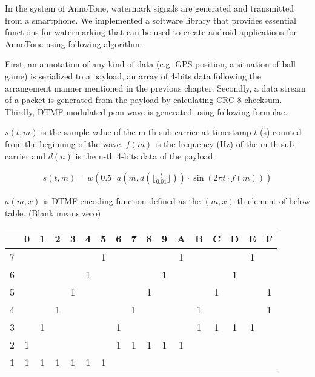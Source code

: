 In the system of AnnoTone, watermark signals are generated and transmitted from a smartphone.
We implemented a software library that provides essential functions for watermarking that can be used to create android applications for AnnoTone using following algorithm.

First, an annotation of any kind of data (e.g. GPS position, a situation of ball game) is serialized to a payload, an array of 4-bits data following the arrangement manner mentioned in the previous chapter.
Secondly, a data stream of a packet is generated from the payload by calculating CRC-8 checksum.
Thirdly, DTMF-modulated pcm wave is generated using following formulae.

$s(t, m)$ is the sample value of the m-th sub-carrier at timestamp $t$ (s) counted from the beginning of the wave. $f(m)$ is the frequency (Hz) of the m-th sub-carrier and $d(n)$ is the n-th 4-bits data of the payload.

\begin{align}
s(t, m) = w( 0.5 \cdot a(m, d(\lfloor \frac{t}{0.01} \rfloor)) \cdot \sin{(2 \pi t \cdot f(m))} )
\end{align}

$a(m, x)$ is DTMF encoding function defined as the $(m, x)$-th element of below table.
(Blank means zero)

\begin{table}[ht]
\begin{center}
	\begin{tabular}{|c||c|c|c|c|c|c|c|c|c|c|c|c|c|c|c|c|} \hline
		  & 0 & 1 & 2 & 3 & 4 & 5 & 6 & 7 & 8 & 9 & A & B & C & D & E & F \\ \hline \hline
		7 &   &   &   &   &   & 1 &   &   &   &   & 1 &   &   &   & 1 &   \\ \hline
		6 &   &   &   &   & 1 &   &   &   &   & 1 &   &   &   & 1 &   &   \\ \hline
		5 &   &   &   & 1 &   &   &   &   & 1 &   &   &   & 1 &   &   & 1 \\ \hline
		4 &   &   & 1 &   &   &   &   & 1 &   &   &   & 1 &   &   &   & 1 \\ \hline
		3 &   & 1 &   &   &   &   & 1 &   &   &   &   & 1 & 1 & 1 & 1 &   \\ \hline
		2 & 1 &   &   &   &   &   & 1 & 1 & 1 & 1 & 1 &   &   &   &   &   \\ \hline
		1 & 1 & 1 & 1 & 1 & 1 & 1 &   &   &   &   &   &   &   &   &   &   \\ \hline
	\end{tabular}
\end{center}
\end{table}

